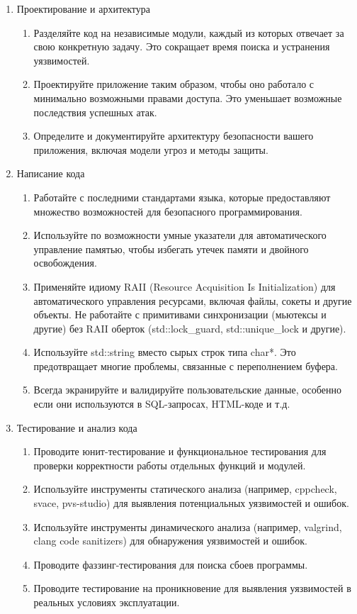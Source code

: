 \begin{enumerate}
    \item Проектирование и архитектура
    \begin{enumerate}
        \item Разделяйте код на независимые модули, каждый из которых отвечает за свою конкретную задачу. Это сокращает время поиска и устранения уязвимостей.
        \item Проектируйте приложение таким образом, чтобы оно работало с минимально возможными правами доступа. Это уменьшает возможные последствия успешных атак.
        \item Определите и документируйте архитектуру безопасности вашего приложения, включая модели угроз и методы защиты.
    \end{enumerate}

    \item Написание кода
    \begin{enumerate}
        \item Работайте с последними стандартами языка, которые предоставляют множество возможностей для безопасного программирования.
        \item Используйте по возможности умные указатели для автоматического управление памятью, чтобы избегать утечек памяти и двойного освобождения.
        \item Применяйте идиому RAII (Resource Acquisition Is Initialization) для автоматического управления ресурсами, включая файлы, сокеты и другие объекты. Не работайте с примитивами синхронизации (мьютексы и другие) без RAII оберток (std::lock\_guard, std::unique\_lock и другие).
        \item Используйте std::string вместо сырых строк типа char*. Это предотвращает многие проблемы, связанные с переполнением буфера.
        \item Всегда экранируйте и валидируйте пользовательские данные, особенно если они используются в SQL-запросах, HTML-коде и т.д.
    \end{enumerate}

    \item Тестирование и анализ кода
    \begin{enumerate}
        \item Проводите юнит-тестирование и функциональное тестирования для проверки корректности работы отдельных функций и модулей.
        \item Используйте инструменты статического анализа (например, cppcheck, svace, pvs-studio) для выявления потенциальных уязвимостей и ошибок.
        \item Используйте инструменты динамического анализа (например, valgrind, clang code sanitizers) для обнаружения уязвимостей и ошибок.
        \item Проводите фаззинг-тестирования для поиска сбоев программы.
        \item Проводите тестирование на проникновение для выявления уязвимостей в реальных условиях эксплуатации.
    \end{enumerate}


\end{enumerate}
